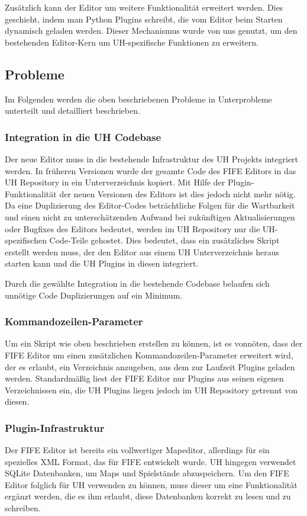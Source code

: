 Zusätzlich kann der Editor um weitere Funktionalität erweitert werden. Dies geschieht,
indem man Python Plugins schreibt, die vom Editor beim Starten dynamisch geladen
werden. Dieser Mechanismus wurde von uns genutzt, um den bestehenden Editor-Kern
um UH-spezifische Funktionen zu erweitern.

\subsection{Probleme}
Im Folgenden werden die oben beschriebenen Probleme in Unterprobleme unterteilt
und detailliert beschrieben.

\subsubsection{Integration in die UH Codebase}
Der neue Editor muss in die bestehende Infrastruktur des UH Projekts integriert werden.
In früheren Versionen wurde der gesamte Code des FIFE Editors in das UH Repository
in ein Unterverzeichnis kopiert. Mit Hilfe der Plugin-Funktionalität der neuen Versionen
des Editors ist dies jedoch nicht mehr nötig. Da eine Duplizierung des Editor-Codes
beträchtliche Folgen für die Wartbarkeit und einen nicht zu unterschätzenden Aufwand
bei zukünftigen Aktualisierungen oder Bugfixes des Editors bedeutet, werden im UH
Repository nur die UH-spezifischen Code-Teile gehostet. Dies bedeutet, dass ein
zusätzliches Skript erstellt werden muss, der den Editor aus einem UH Unterverzeichnis
heraus starten kann und die UH Plugins in diesen integriert.

Durch die gewählte Integration in die bestehende Codebase belaufen sich unnötige
Code Duplizierungen auf ein Minimum.


\subsubsection{Kommandozeilen-Parameter}
Um ein Skript wie oben beschrieben erstellen zu können, ist es vonnöten, dass
der FIFE Editor um einen zusätzlichen Kommandozeilen-Parameter erweitert wird,
der es erlaubt, ein Verzeichnis anzugeben, aus dem zur Laufzeit Plugins geladen
werden.
Standardmäßig liest der FIFE Editor nur Plugins aus seinen eigenen
Verzeichnissen ein, die UH Plugins liegen jedoch im UH Repository getrennt von
diesen.

\subsubsection{Plugin-Infrastruktur}
Der FIFE Editor ist bereits ein vollwertiger Mapeditor, allerdings für ein spezielles XML Format,
das für FIFE entwickelt wurde. UH hingegen verwendet SQLite Datenbanken, um Maps und Spielstände
abzuspeichern. Um den FIFE Editor folglich für UH verwenden zu können, muss dieser um eine
Funktionalität ergänzt werden, die es ihm erlaubt, diese Datenbanken korrekt zu lesen und zu schreiben.

